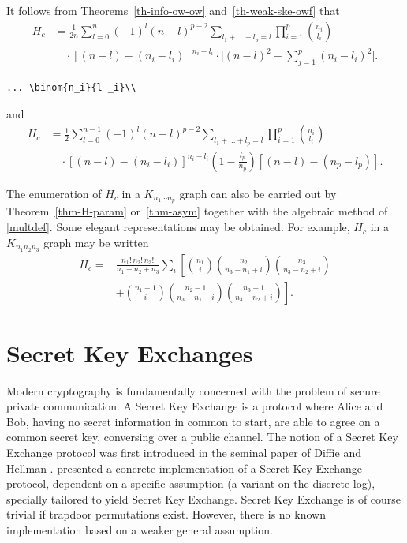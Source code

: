 \documentclass{article}
\theoremstyle{definition}
\theoremstyle{remark}
\begin{document}
It follows from Theorems~\ref{th-info-ow-ow} and~\ref{th-weak-ske-owf} that
\begin{equation}\label{e:barwq}
\begin{split}
H_c&=\frac1{2n}
\sum^n_{{l}=0}(-1)^{l}(n-{l})^{p-2}
\sum_{l _1+\dots+l _p=l}\prod^p_{i=1}
\binom{n_i}{l _i}\\
&\quad\cdot[(n-l )-(n_i-l _i)]^{n_i-l _i}\cdot
\biggl[(n-l )^2-\sum^p_{j=1}(n_i-l _i)^2\biggr].\end{split}
\end{equation}
\begin{verbatim}
... \binom{n_i}{l _i}\\
\end{verbatim}
and
\begin{equation}\label{joe}
\begin{split}
H_c&=\frac12\sum^{n-1}_{l =0}
(-1)^{l}(n-l )^{p-2}
\sum_{l _1+\dots+l _p=l}
\prod^p_{i=1}\binom{n_i}{l _i}\\
&\quad\cdot[(n-l )-(n_i-l _i)]^{n_i-l _i}
\left(1-\frac{l _p}{n_p}\right)
[(n-l )-(n_p-l _p)].
\end{split}
\end{equation}

The enumeration of $H_c$ in a $K_{n_1\dotsm n_p}$ graph can also be
carried out by Theorem~\ref{thm-H-param} or~\ref{thm-asym}
together with the algebraic method of \eqref{multdef}.
Some elegant representations may be obtained. For example, $H_c$ in
a $K_{n_1n_2n_3}$ graph may be written
\begin{equation}\label{j:mark}
\begin{split}
H_c=&
\frac{n_1!\,n_2!\,n_3!}
{n_1+n_2+n_3}\sum_i\left[\binom{n_1}{i}
\binom{n_2}{n_3-n_1+i}\binom{n_3}{n_3-n_2+i}\right.\\
&+\left.\binom{n_1-1}{i}
\binom{n_2-1}{n_3-n_1+i}
\binom{n_3-1}{n_3-n_2+i}\right].\end{split}
\end{equation}

\section{Secret Key Exchanges}
\label{SKE}

Modern cryptography is fundamentally concerned with the problem of
secure private communication.  A Secret Key Exchange is a protocol
where Alice and Bob, having no secret information in common to start,
are able to agree on a common secret key, conversing over a public
channel.  The notion of a Secret Key Exchange protocol was first
introduced in the seminal paper of Diffie and Hellman
\cite{dihe:newdir}. \cite{dihe:newdir} presented a concrete
implementation of a Secret Key Exchange protocol, dependent on a
specific assumption (a variant on the discrete log), specially
tailored to yield Secret Key Exchange. Secret Key Exchange is of
course trivial if trapdoor permutations exist. However, there is no
known implementation based on a weaker general assumption.
\end{document}
